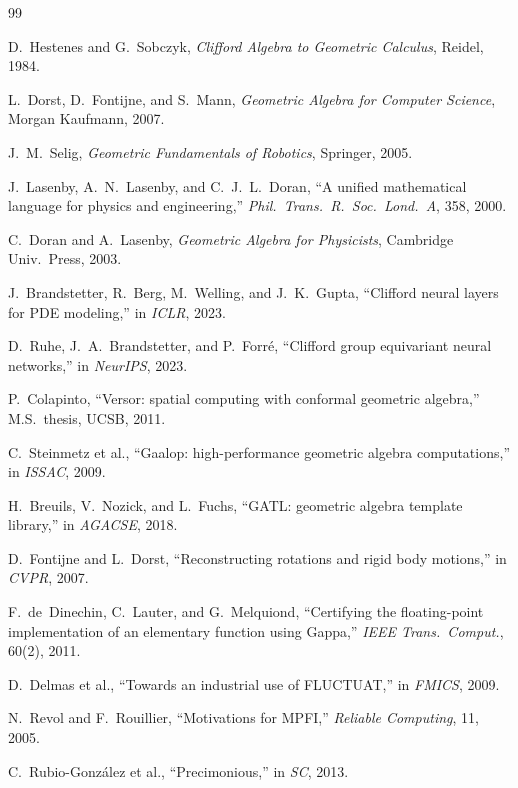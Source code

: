 \documentclass[11pt,a4paper]{article}
\theoremstyle{definition}
\theoremstyle{plain}
\theoremstyle{remark}
\begin{document}
\begin{thebibliography}{99}

D.~Hestenes and G.~Sobczyk,
\emph{Clifford Algebra to Geometric Calculus}, Reidel, 1984.

L.~Dorst, D.~Fontijne, and S.~Mann,
\emph{Geometric Algebra for Computer Science}, Morgan Kaufmann, 2007.

J.~M.~Selig,
\emph{Geometric Fundamentals of Robotics}, Springer, 2005.

J.~Lasenby, A.~N.~Lasenby, and C.~J.~L.~Doran,
``A unified mathematical language for physics and engineering,''
\emph{Phil.\ Trans.\ R.\ Soc.\ Lond.\ A}, 358, 2000.

C.~Doran and A.~Lasenby,
\emph{Geometric Algebra for Physicists}, Cambridge Univ.\ Press, 2003.

J.~Brandstetter, R.~Berg, M.~Welling, and J.~K.~Gupta,
``Clifford neural layers for PDE modeling,''
in \emph{ICLR}, 2023.

D.~Ruhe, J.~A.~Brandstetter, and P.~Forr\'{e},
``Clifford group equivariant neural networks,''
in \emph{NeurIPS}, 2023.

P.~Colapinto,
``Versor: spatial computing with conformal geometric algebra,''
M.S.\ thesis, UCSB, 2011.

C.~Steinmetz et al.,
``Gaalop: high-performance geometric algebra computations,''
in \emph{ISSAC}, 2009.

H.~Breuils, V.~Nozick, and L.~Fuchs,
``GATL: geometric algebra template library,'' in \emph{AGACSE}, 2018.

D.~Fontijne and L.~Dorst,
``Reconstructing rotations and rigid body motions,''
in \emph{CVPR}, 2007.

F.~de~Dinechin, C.~Lauter, and G.~Melquiond,
``Certifying the floating-point implementation of an elementary function
using Gappa,''
\emph{IEEE Trans.\ Comput.}, 60(2), 2011.

D.~Delmas et al.,
``Towards an industrial use of FLUCTUAT,'' in \emph{FMICS}, 2009.

N.~Revol and F.~Rouillier,
``Motivations for MPFI,'' \emph{Reliable Computing}, 11, 2005.

C.~Rubio-González et al.,
``Precimonious,'' in \emph{SC}, 2013.


\end{thebibliography}
\end{document}

